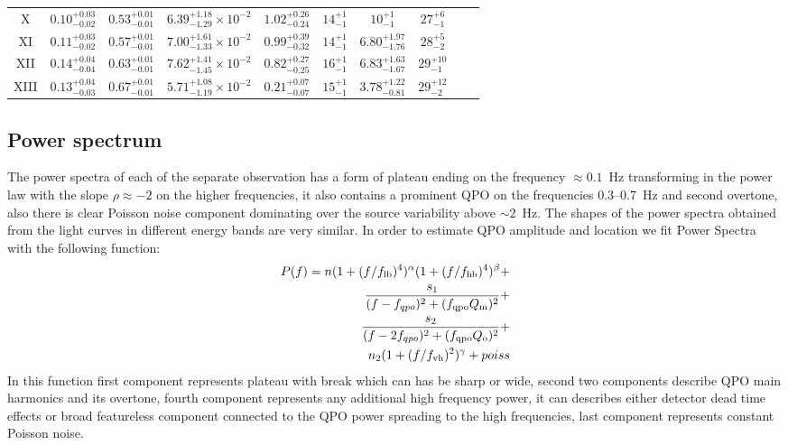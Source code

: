 \documentclass[a4paper,fleqn,usenatbib]{mnras}
\begin{document}
\begin{table}
\begin{tabular}{|c|c|c|c|c|c|c|c|c|c|}
X & $0.10_{-0.02}^{+0.03}$ & $0.53_{-0.01}^{+0.01}$ & $6.39_{-1.29}^{+1.18}\times10^{-2}$ & $1.02_{-0.24}^{+0.26}$ & $14_{-1}^{+1}$ & $10_{-1}^{+1}$ & $27_{-1}^{+6}$ & & \\
XI & $0.11_{-0.02}^{+0.03}$ & $0.57_{-0.01}^{+0.01}$ & $7.00_{-1.33}^{+1.61}\times10^{-2}$ & $0.99_{-0.32}^{+0.39}$ & $14_{-1}^{+1}$ & $6.80_{-1.76}^{+1.97}$ & $28_{-2}^{+5}$ & & \\
XII & $0.14_{-0.04}^{+0.04}$ & $0.63_{-0.01}^{+0.01}$ & $7.62_{-1.45}^{+1.41}\times10^{-2}$ & $0.82_{-0.25}^{+0.27}$ & $16_{-1}^{+1}$ & $6.83_{-1.67}^{+1.63}$ & $29_{-1}^{+10}$ & & \\
XIII & $0.13_{-0.03}^{+0.04}$ & $0.67_{-0.01}^{+0.01}$ & $5.71_{-1.19}^{+1.08}\times10^{-2}$ & $0.21_{-0.07}^{+0.07}$ & $15_{-1}^{+1}$ & $3.78_{-0.81}^{+1.22}$ & $29_{-2}^{+12}$ & & \\
\hline
\end{tabular}

\end{table}

\subsection{Power spectrum}
    The power spectra of each of the separate observation has a form of plateau ending on the frequency $\approx0.1$~Hz transforming in the power law with the slope $\rho\approx-2$ on the higher frequencies, it also contains a prominent QPO on the frequencies 0.3--0.7~Hz and second overtone, also there is clear Poisson noise component dominating over the source variability above $\sim2$~Hz.
    The shapes of the power spectra obtained from the light curves in different energy bands are very similar.
    In order to estimate QPO amplitude and location we fit Power Spectra with the following function:
\begin{equation}
        \begin{split}
        P(f) = n (1 + (f/f_{\rm lb})^4)^{\alpha} (1 + (f/f_{\rm hb})^4)^{\beta} + \\
        \frac{s_1}{(f - f_{qpo})^2 + (f_{\rm qpo} Q_{\rm m})^2} +\\
        \frac{s_2}{(f - 2f_{qpo})^2 + (f_{\rm qpo} Q_{\rm o})^2} + \\
        n_2 (1 + (f/f_{\rm vh})^2)^{\gamma} + poiss
\end{split}
        \label{eq:complex_fit}
\end{equation}
In this function first component represents plateau with break which can has be sharp or wide, second two components describe QPO main harmonics and its overtone, fourth component represents any additional high frequency power, it can describes either detector dead time effects or broad featureless component connected to the QPO power spreading to the high frequencies, last component represents constant Poisson noise.
\end{document}
